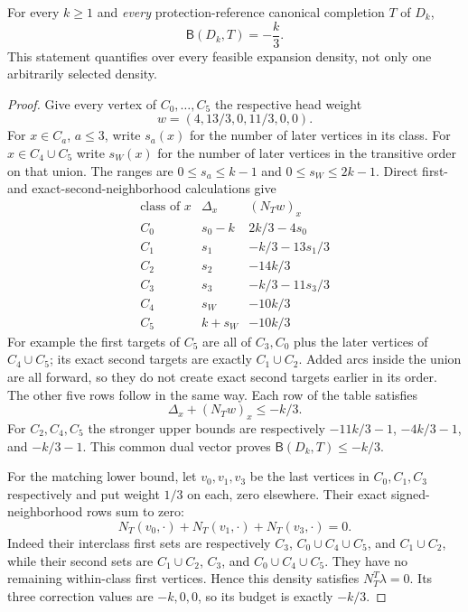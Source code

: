 \begin{theorem}
\label{thm:transport-clone-obstruction}
For every $k\ge1$ and \emph{every} protection-reference canonical
completion $T$ of $D_k$,
\[
 \mathsf B(D_k,T)=-\frac{k}{3}.
\]
This statement quantifies over every feasible expansion density, not
only one arbitrarily selected density.
\end{theorem}
\begin{proof}
Give every vertex of $C_0,\ldots,C_5$ the respective head weight
\[
 w=(4,13/3,0,11/3,0,0).
\]
For $x\in C_a$, $a\le3$, write $s_a(x)$ for the number of later
vertices in its class. For $x\in C_4\cup C_5$ write $s_W(x)$ for
the number of later vertices in the transitive order on that union.
The ranges are $0\le s_a\le k-1$ and $0\le s_W\le2k-1$.
Direct first- and exact-second-neighborhood calculations give
\[
\begin{array}{c|c|c}
 \text{class of }x&\Delta_x&(N_Tw)_x\\\hline
 C_0&s_0-k&2k/3-4s_0\\
 C_1&s_1&-k/3-13s_1/3\\
 C_2&s_2&-14k/3\\
 C_3&s_3&-k/3-11s_3/3\\
 C_4&s_W&-10k/3\\
 C_5&k+s_W&-10k/3
\end{array}
\]
For example the first targets of $C_5$ are all of $C_3,C_0$ plus
the later vertices of $C_4\cup C_5$; its exact second targets are
exactly $C_1\cup C_2$. Added arcs inside the union are all forward,
so they do not create exact second targets earlier in its order.
The other five rows follow in the same way.
Each row of the table satisfies
\[
 \Delta_x+(N_Tw)_x\le-k/3.
\]
For $C_2,C_4,C_5$ the stronger upper bounds are respectively
$-11k/3-1$, $-4k/3-1$, and $-k/3-1$. This common dual vector
proves $\mathsf B(D_k,T)\le-k/3$.

For the matching lower bound, let $v_0,v_1,v_3$ be the last vertices
in $C_0,C_1,C_3$ respectively and put weight $1/3$ on each, zero
elsewhere. Their exact signed-neighborhood rows sum to zero:
\[
 N_T(v_0,\cdot)+N_T(v_1,\cdot)+N_T(v_3,\cdot)=0.
\]
Indeed their interclass first sets are respectively $C_3$,
$C_0\cup C_4\cup C_5$, and $C_1\cup C_2$, while their second
sets are $C_1\cup C_2$, $C_3$, and $C_0\cup C_4\cup C_5$.
They have no remaining within-class first vertices. Hence this density
satisfies $N_T^T\lambda=0$. Its three correction values are $-k,0,0$,
so its budget is exactly $-k/3$.
\end{proof}

